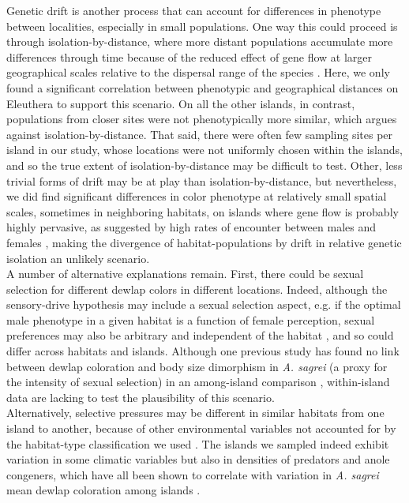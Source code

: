 Genetic drift is another process that can account for differences in phenotype between localities, especially in small populations. One way this could proceed is through isolation-by-distance, where more distant populations accumulate more differences through time because of the reduced effect of gene flow at larger geographical scales relative to the dispersal range of the species \citep{Rousset2004}. Here, we only found a significant correlation between phenotypic and geographical distances on Eleuthera to support this scenario. On all the other islands, in contrast, populations from closer sites were not phenotypically more similar, which argues against isolation-by-distance. That said, there were often few sampling sites per island in our study, whose locations were not uniformly chosen within the islands, and so the true extent of isolation-by-distance may be difficult to test. Other, less trivial forms of drift may be at play than isolation-by-distance, but nevertheless, we did find significant differences in color phenotype at relatively small spatial scales, sometimes in neighboring habitats, on islands where gene flow is probably highly pervasive, as suggested by high rates of encounter between males and females \citep{Kamath2018}, making the divergence of habitat-populations by drift in relative genetic isolation an unlikely scenario.\\

A number of alternative explanations remain. First, there could be sexual selection for different dewlap colors in different locations. Indeed, although the sensory-drive hypothesis may include a sexual selection aspect, e.g. if the optimal male phenotype in a given habitat is a function of female perception, sexual preferences may also be arbitrary and independent of the habitat \citep{Andersson1994}, and so could differ across habitats and islands. Although one previous study has found no link between dewlap coloration and body size dimorphism in \textit{A. sagrei} (a proxy for the intensity of sexual selection) in an among-island comparison \citep{Baeckens2018}, within-island data are lacking to test the plausibility of this scenario.\\

Alternatively, selective pressures may be different in similar habitats from one island to another, because of other environmental variables not accounted for by the habitat-type classification we used \citep{Howard1950, Schoener1968}. The islands we sampled indeed exhibit variation in some climatic variables but also in densities of predators and anole congeners, which have all been shown to correlate with variation in \textit{A. sagrei} mean dewlap coloration among islands \citep{Vanhooydonck2009, Baeckens2018}.\\

